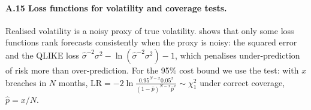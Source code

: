 \paragraph{A.15 Loss functions for volatility and coverage tests.} Realised volatility is a noisy proxy
of true volatility. \citet{patton2011} shows that only some loss functions rank forecasts consistently when
the proxy is noisy: the squared error and the QLIKE loss $\hat\sigma^{-2}\sigma^2-\ln(\hat\sigma^{-2}\sigma^2)-1$,
which penalises under-prediction of risk more than over-prediction. For the 95\% cost bound we use the
\citet{kupiec1995} test: with $x$ breaches in $N$ months, $\mathrm{LR}=-2\ln\frac{0.95^{N-x}0.05^{x}}
{(1-\hat p)^{N-x}\hat p^{x}}\sim\chi^2_1$ under correct coverage, $\hat p=x/N$.
